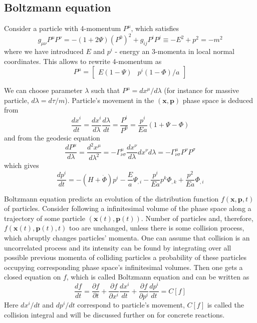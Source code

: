 \documentclass[12pt]{extarticle}
\numberwithin{problem}{section}
\numberwithin{theorem}{section}
\begin{document}
	\subsection{Boltzmann equation}
	Consider a particle with 4-momentum $P^\mu$, which satisfies 
	\begin{equation}
		g_{\mu\nu} P^\mu P^\nu = -(1 + 2\Psi)(P^0)^2 + g_{ij}P^iP^j \equiv -E^2 + p^2 = -m^2
	\end{equation}
	where we have introduced $E$ and $p^i$ - energy an 3-momenta in local normal coordinates. This allows to rewrite 4-momentum as 
	\begin{equation}
		\label{eq:4-momentum}
		P^\mu = \begin{bmatrix}
			E(1 - \Psi) & p^i(1 - \Phi) / a
		\end{bmatrix}
	\end{equation}
	
	We can choose parameter $\lambda$ such that $P^\mu = dx^\mu/d\lambda$ (for instance for massive particle, $d\lambda = d\tau/m$). Particle's movement in the $(\mathbf{x},\mathbf{p})$ phase space is deduced from
	\begin{equation}
		\label{eq:boltzmann:position}
		\frac{dx^i}{dt} = \frac{dx^i}{d\lambda}\frac{d\lambda}{dt} = \frac{P^i}{P^0} = \frac{p^i}{Ea}(1+\Psi-\Phi)
	\end{equation}
	and from the geodesic equation
	\begin{equation}
		\label{eq:boltzmann:momentum}
		\frac{dP^\mu}{d\lambda} = \frac{d^2x^\mu}{d\lambda^2} = -\Gamma^\mu_{\nu\sigma}\frac{dx^\nu}{d\lambda}{dx^\nu}{d\lambda} = -\Gamma^\mu_{\nu\sigma}P^\nu P^\sigma
	\end{equation}
	which gives
	\begin{equation}
		\frac{dp^i}{dt} = -(H + \dot{\Phi})p^i - \frac{E}{a}\Psi_{,i} - \frac{p^i}{Ea}p^k\Phi_{,k} + \frac{p^2}{Ea}\Phi_{,i}
	\end{equation}

	Boltzmann equation predicts an evolution of the distribution function $f(\mathbf{x},\mathbf{p},t)$ of particles. Consider following a infinitesimal volume of the phase space along a trajectory of some particle $(\mathbf{x}(t),\mathbf{p}(t))$. Number of particles and, therefore, $f(\mathbf{x}(t),\mathbf{p}(t), t)$ too are unchanged, unless there is some collision process, which abruptly changes particles' momenta. One can assume that collision is an uncorrelated process and its intensity can be found by integrating over all possible previous momenta of colliding particles a probability of these particles occupying corresponding phase space's infinitesimal volumes. Then one gets a closed equation on $f$, which is called Boltzmann equation and can be written as 
	\begin{equation}
		\frac{df}{dt} = \frac{\partial f}{\partial t} + \frac{\partial f}{\partial x^i} \frac{dx^i}{dt} + \frac{\partial f}{\partial p^i} \frac{dp^i}{dt} = C[f]
	\end{equation}
	Here $dx^i/dt$ and $dp^i/dt$ correspond to particle's movement, $C[f]$ is called the collision integral and will be discussed further on for concrete reactions.
	
\end{document}
